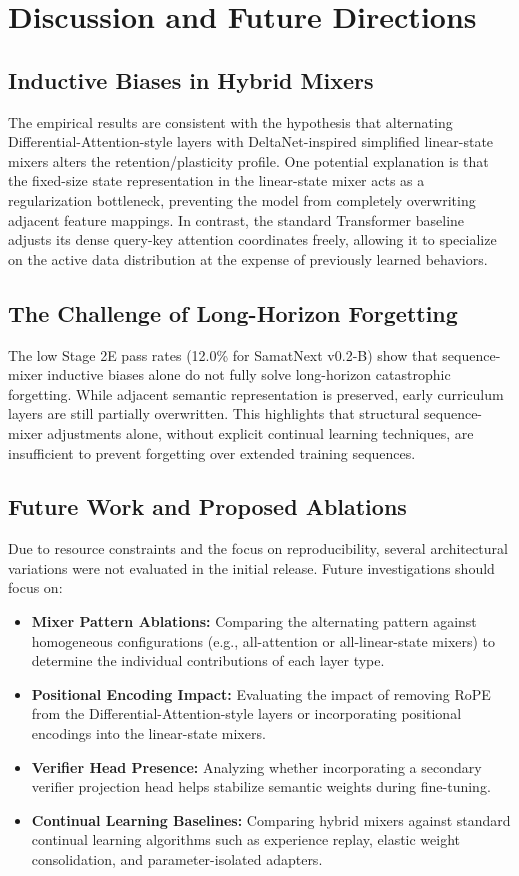 \documentclass[11pt,a4paper]{article}
\begin{document}
\section{Discussion and Future Directions}
\subsection{Inductive Biases in Hybrid Mixers}
The empirical results are consistent with the hypothesis that alternating Differential-Attention-style layers with DeltaNet-inspired simplified linear-state mixers alters the retention/plasticity profile. One potential explanation is that the fixed-size state representation in the linear-state mixer acts as a regularization bottleneck, preventing the model from completely overwriting adjacent feature mappings. In contrast, the standard Transformer baseline adjusts its dense query-key attention coordinates freely, allowing it to specialize on the active data distribution at the expense of previously learned behaviors.

\subsection{The Challenge of Long-Horizon Forgetting}
The low Stage 2E pass rates (12.0\% for SamatNext v0.2-B) show that sequence-mixer inductive biases alone do not fully solve long-horizon catastrophic forgetting. While adjacent semantic representation is preserved, early curriculum layers are still partially overwritten. This highlights that structural sequence-mixer adjustments alone, without explicit continual learning techniques, are insufficient to prevent forgetting over extended training sequences.

\subsection{Future Work and Proposed Ablations}
Due to resource constraints and the focus on reproducibility, several architectural variations were not evaluated in the initial release. Future investigations should focus on:
\begin{itemize}
    \item \textbf{Mixer Pattern Ablations:} Comparing the alternating pattern against homogeneous configurations (e.g., all-attention or all-linear-state mixers) to determine the individual contributions of each layer type.
    \item \textbf{Positional Encoding Impact:} Evaluating the impact of removing RoPE from the Differential-Attention-style layers or incorporating positional encodings into the linear-state mixers.
    \item \textbf{Verifier Head Presence:} Analyzing whether incorporating a secondary verifier projection head helps stabilize semantic weights during fine-tuning.
    \item \textbf{Continual Learning Baselines:} Comparing hybrid mixers against standard continual learning algorithms such as experience replay, elastic weight consolidation, and parameter-isolated adapters.
\end{itemize}
\end{document}
